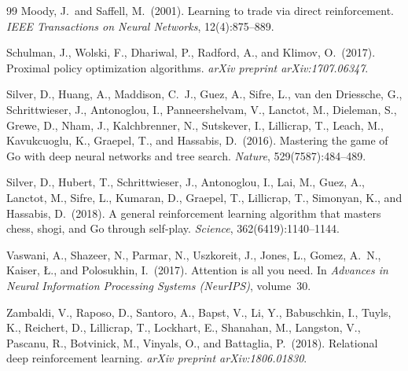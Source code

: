 \documentclass[11pt, a4paper]{article}
\begin{document}
\begin{thebibliography}{99}
Moody, J.\ and Saffell, M.\ (2001).
\newblock Learning to trade via direct reinforcement.
\newblock \textit{IEEE Transactions on Neural Networks}, 12(4):875--889.

Schulman, J., Wolski, F., Dhariwal, P., Radford, A., and Klimov, O.\ (2017).
\newblock Proximal policy optimization algorithms.
\newblock \textit{arXiv preprint arXiv:1707.06347}.

Silver, D., Huang, A., Maddison, C.~J., Guez, A., Sifre, L., van den
  Driessche, G., Schrittwieser, J., Antonoglou, I., Panneershelvam, V.,
  Lanctot, M., Dieleman, S., Grewe, D., Nham, J., Kalchbrenner, N., Sutskever,
  I., Lillicrap, T., Leach, M., Kavukcuoglu, K., Graepel, T., and Hassabis,
  D.\ (2016).
\newblock Mastering the game of {Go} with deep neural networks and tree search.
\newblock \textit{Nature}, 529(7587):484--489.

Silver, D., Hubert, T., Schrittwieser, J., Antonoglou, I., Lai, M., Guez, A.,
  Lanctot, M., Sifre, L., Kumaran, D., Graepel, T., Lillicrap, T.,
  Simonyan, K., and Hassabis, D.\ (2018).
\newblock A general reinforcement learning algorithm that masters chess, shogi,
  and {Go} through self-play.
\newblock \textit{Science}, 362(6419):1140--1144.

Vaswani, A., Shazeer, N., Parmar, N., Uszkoreit, J., Jones, L., Gomez,
  A.~N., Kaiser, {\L}., and Polosukhin, I.\ (2017).
\newblock Attention is all you need.
\newblock In \textit{Advances in Neural Information Processing Systems
  (NeurIPS)}, volume~30.

Zambaldi, V., Raposo, D., Santoro, A., Bapst, V., Li, Y., Babuschkin, I.,
  Tuyls, K., Reichert, D., Lillicrap, T., Lockhart, E., Shanahan, M.,
  Langston, V., Pascanu, R., Botvinick, M., Vinyals, O., and Battaglia, P.\
  (2018).
\newblock Relational deep reinforcement learning.
\newblock \textit{arXiv preprint arXiv:1806.01830}.

\end{thebibliography}
\end{document}
